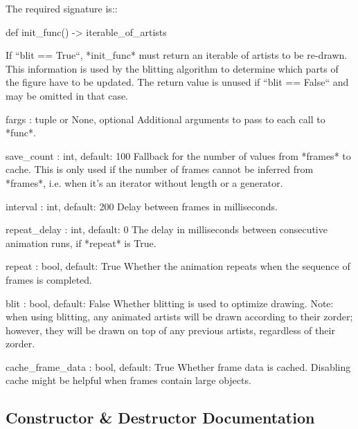 \begin{DoxyVerb}
    The required signature is::

        def init_func() -> iterable_of_artists

    If ``blit == True``, *init_func* must return an iterable of artists
    to be re-drawn. This information is used by the blitting algorithm to
    determine which parts of the figure have to be updated.  The return
    value is unused if ``blit == False`` and may be omitted in that case.

fargs : tuple or None, optional
    Additional arguments to pass to each call to *func*.

save_count : int, default: 100
    Fallback for the number of values from *frames* to cache. This is
    only used if the number of frames cannot be inferred from *frames*,
    i.e. when it's an iterator without length or a generator.

interval : int, default: 200
    Delay between frames in milliseconds.

repeat_delay : int, default: 0
    The delay in milliseconds between consecutive animation runs, if
    *repeat* is True.

repeat : bool, default: True
    Whether the animation repeats when the sequence of frames is completed.

blit : bool, default: False
    Whether blitting is used to optimize drawing.  Note: when using
    blitting, any animated artists will be drawn according to their zorder;
    however, they will be drawn on top of any previous artists, regardless
    of their zorder.

cache_frame_data : bool, default: True
    Whether frame data is cached.  Disabling cache might be helpful when
    frames contain large objects.
\end{DoxyVerb}
 

\subsection{Constructor \& Destructor Documentation}
\mbox{\label{classmatplotlib_1_1animation_1_1FuncAnimation_ab3f83d2945e80b4ba681bc0acef28e7f}} 
